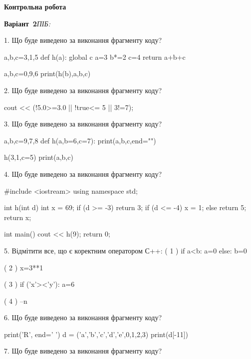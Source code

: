 \documentclass[11pt]{article}
\begin{document}
{\large\textbf{Контрольна робота}}

\textbf{Варіант \No\,2}\hfill \textit{ПІБ:}\,\underline{\hspace{60mm}}
\vspace{4mm}

1. Що буде виведено за виконання фрагменту коду?

a,b,c=3,1,5
def h(a):
global c    a=3
    b*=2
    c=4
    return a+b+c

a,b,c=0,9,6
print(h(b),a,b,c)
\vspace{5mm}

2. Що буде виведено за виконання фрагменту коду?

cout << (!5.0>=3.0 || !true<= 5 || 3!=7);
\vspace{5mm}

3. Що буде виведено за виконання фрагменту коду?

a,b,c=9,7,8
def h(a,b=6,c=7):
    print(a,b,c,end="")

h(3,1,c=5)
print(a,b,c)

\vspace{5mm}

4. Що буде виведено за виконання фрагменту коду?

#include <iostream>
using namespace std;

int h(int d){
    int x = 69;
    if (d >= -3) 
        return 3;
    if (d <= -4)
         x = 1;
    else
         return 5;
    return x;
}

int main(){
    cout << h(9);
    return 0;
}

\vspace{5mm}

5. %
Відмітити все, що є коректним оператором С++:
( 1 ) if a<b: a=0 else: b=0

( 2 ) x=3**1

( 3 ) if ('x'><'y'): a=6

( 4 ) --n
\vspace{5mm}

6. Що буде виведено за виконання фрагменту коду?

print('R', end=' ')
d = ('a','b','c','d','e',0,1,2,3)
print(d[-11])

\vspace{5mm}

7. Що буде виведено за виконання фрагменту коду?
\end{document}
